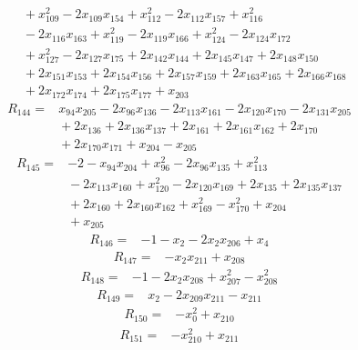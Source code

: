 {\begin{align*}
&{}  + x_{109}^{2} - 2x_{109} x_{154} + x_{112}^{2} - 2x_{112} x_{157} + x_{116}^{2} \\
&{}  - 2x_{116} x_{163} + x_{119}^{2} - 2x_{119} x_{166} + x_{124}^{2} - 2x_{124} x_{172} \\
&{}  + x_{127}^{2} - 2x_{127} x_{175} + 2x_{142} x_{144} + 2x_{145} x_{147} + 2x_{148} x_{150} \\
&{}  + 2x_{151} x_{153} + 2x_{154} x_{156} + 2x_{157} x_{159} + 2x_{163} x_{165} + 2x_{166} x_{168} \\
&{}  + 2x_{172} x_{174} + 2x_{175} x_{177} + x_{203}
\end{align*}
\begin{align*}
R_{144} ={}& x_{94} x_{205} - 2x_{96} x_{136} - 2x_{113} x_{161} - 2x_{120} x_{170} - 2x_{131} x_{205} \\
&{}  + 2x_{136} + 2x_{136} x_{137} + 2x_{161} + 2x_{161} x_{162} + 2x_{170} \\
&{}  + 2x_{170} x_{171} + x_{204} - x_{205}
\end{align*}
\begin{align*}
R_{145} ={}& -2 - x_{94} x_{204} + x_{96}^{2} - 2x_{96} x_{135} + x_{113}^{2} \\
&{}  - 2x_{113} x_{160} + x_{120}^{2} - 2x_{120} x_{169} + 2x_{135} + 2x_{135} x_{137} \\
&{}  + 2x_{160} + 2x_{160} x_{162} + x_{169}^{2} - x_{170}^{2} + x_{204} \\
&{}  + x_{205}
\end{align*}
\begin{align*}
R_{146} ={}& -1 - x_{2} - 2x_{2} x_{206} + x_{4}
\end{align*}
\begin{align*}
R_{147} ={}& -x_{2} x_{211} + x_{208}
\end{align*}
\begin{align*}
R_{148} ={}& -1 - 2x_{2} x_{208} + x_{207}^{2} - x_{208}^{2}
\end{align*}
\begin{align*}
R_{149} ={}& x_{2} - 2x_{209} x_{211} - x_{211}
\end{align*}
\begin{align*}
R_{150} ={}& -x_{0}^{2} + x_{210}
\end{align*}
\begin{align*}
R_{151} ={}& -x_{210}^{2} + x_{211}
\end{align*}
}
